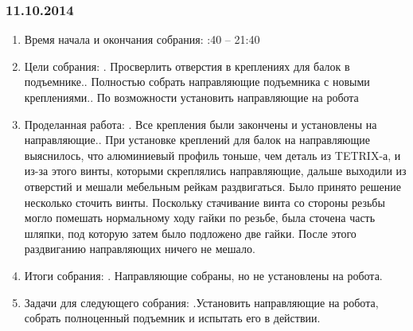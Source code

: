 \documentclass[12pt]{article}
\begin{document}
	      \subsubsection{11.10.2014}
	      \begin{enumerate}
	      	\item Время начала и окончания собрания:
	      	:40 – 21:40
	      	\item Цели собрания:
	      	.	Просверлить отверстия в креплениях для балок в подъемнике..	Полностью собрать направляющие подъемника с новыми креплениями..	По возможности установить направляющие на робота
	      	\newline
	      	\item Проделанная работа:
	      	. Все крепления были закончены и установлены на направляющие..	При установке креплений для балок на направляющие выяснилось, что алюминиевый профиль тоньше, чем деталь из TETRIX-а, и из-за этого винты, которыми скреплялись направляющие, дальше выходили из отверстий и мешали мебельным рейкам раздвигаться. Было принято решение несколько сточить винты. Поскольку стачивание винта со стороны резьбы могло помешать нормальному ходу гайки по резьбе, была сточена часть шляпки, под которую затем было подложено две гайки. После этого раздвиганию направляющих ничего не мешало.
	      	\item Итоги собрания:
	      	.	Направляющие собраны, но не установлены на робота.
	      	\item Задачи для следующего собрания:
	      	.Установить направляющие на робота, собрать полноценный подъемник и испытать его в действии.
	      \end{enumerate}
	      \newpage
\end{document}
